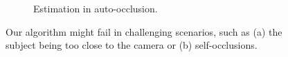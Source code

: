 \begin{figure}[h]
\begin{subfigure}{0.49\textwidth}
        \caption{Estimation in auto-occlusion.}
        \label{subfig:occlusion}
    \end{subfigure}
    \caption{Our algorithm might fail in challenging scenarios, such as (a) the subject being too close to the camera or (b) self-occlusions.}
    \label{fig:demo_failures}
\end{figure}